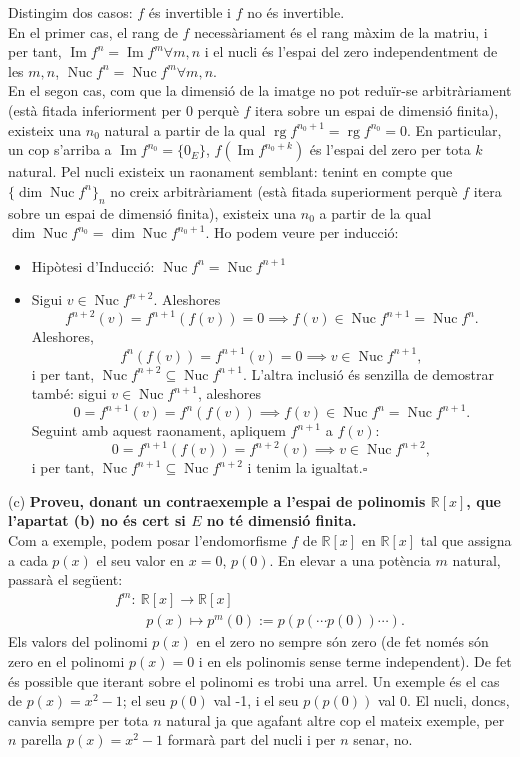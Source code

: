 \documentclass[11pt]{article}
\DeclareMathOperator{\nuc}{Nuc}
\DeclareMathOperator{\img}{Im}
\DeclareMathOperator{\rg}{rg}
\begin{document}
\begin{legal}
	Distingim dos casos: $f$ és invertible i $f$ no és invertible.\\
	En el primer cas, el rang de $f$ necessàriament és el rang màxim de la matriu, i per tant, $\img{f^n}=\img{f^m}\forall m,n$ i el nucli és l'espai del zero independentment de les $m,n$, $\nuc{f^n}=\nuc{f^m}\forall m,n$.\\
	En el segon cas, com que la dimensió de la imatge no pot reduïr-se arbitràriament (està fitada inferiorment per 0 perquè $f$ itera sobre un espai de dimensió finita), existeix una $n_0$ natural a partir de la qual $\rg{f^{n_0+1}}=\rg{f^{n_0}}=0$. En particular, un cop s'arriba a $\img{f^{n_0}}=\{0_E\}$, $f(\img{f^{n_0+k}})$ és l'espai del zero per tota $k$ natural. Pel nucli existeix un raonament semblant: tenint en compte que $\{\dim\nuc{f^n}\}_n$ no creix arbitràriament (està fitada superiorment perquè $f$ itera sobre un espai de dimensió finita), existeix una $n_0$ a partir de la qual $\dim{\nuc{f^{n_0}}}=\dim{\nuc{f^{n_0+1}}}$. Ho podem veure per inducció:
	\begin{itemize}
	\item Hipòtesi d'Inducció: $\nuc{f^n}=\nuc{f^{n+1}}$
	\item Sigui $v\in\nuc{f^{n+2}}$. Aleshores
	$$
	f^{n+2}(v)=f^{n+1}(f(v))=0\implies f(v)\in\nuc{f^{n+1}}=\nuc{f^n}.
	$$
	Aleshores,
	$$
	f^n(f(v))=f^{n+1}(v)=0\implies v\in\nuc{f^{n+1}},
	$$
	i per tant, $\nuc{f^{n+2}}\subseteq\nuc{f^{n+1}}$.
	L'altra inclusió és senzilla de demostrar també: sigui $v\in\nuc{f^{n+1}}$, aleshores
	$$
	0=f^{n+1}(v)=f^n(f(v))\implies f(v)\in\nuc{f^n}=\nuc{f^{n+1}}.
	$$
	Seguint amb aquest raonament, apliquem $f^{n+1}$ a $f(v)$:
	$$
	0=f^{n+1}(f(v))=f^{n+2}(v)\implies v\in\nuc{f^{n+2}},
	$$
	i per tant, $\nuc{f^{n+1}}\subseteq\nuc{f^{n+2}}$ i tenim la igualtat.$\square$
	\end{itemize}
	\item[(c) ]\textbf{Proveu, donant un contraexemple a l’espai de polinomis $\mathbb{R}[x]$, que l’apartat (b) no és cert si $E$ no té dimensió finita.}\\
	Com a exemple, podem posar l'endomorfisme $f$ de $\mathbb{R}[x]$ en $\mathbb{R}[x]$ tal que assigna a cada $p(x)$ el seu valor en $x=0$, $p(0)$. En elevar a una potència $m$ natural, passarà el següent:
	$$
	\begin{array}{lll}
	f^m:\ \mathbb{R}[x]\longrightarrow\mathbb{R}[x]\\
	\qquad\ p(x)\longmapsto p^m(0):=p(p(\cdots p(0))\cdots).
	\end{array}
	$$
	Els valors del polinomi $p(x)$ en el zero no sempre són zero (de fet només són zero en el polinomi $p(x)=0$ i en els polinomis sense terme independent). De fet és possible que iterant sobre el polinomi es trobi una arrel. Un exemple és el cas de $p(x)=x^2-1$; el seu $p(0)$ val -1, i el seu $p(p(0))$ val 0. El nucli, doncs, canvia sempre per tota $n$ natural ja que agafant altre cop el mateix exemple, per $n$ parella $p(x)=x^2-1$ formarà part del nucli i per $n$ senar, no.
\end{legal}
\end{document}

